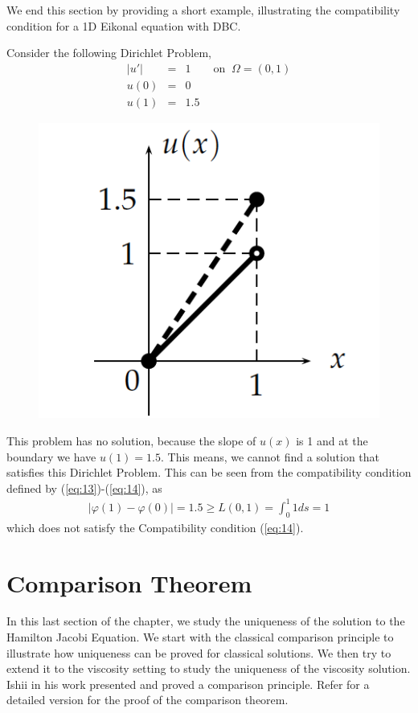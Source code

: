 \noindent
We end this section by providing a short example, illustrating the
compatibility condition for a 1D Eikonal equation with DBC.
\begin{example}
  Consider the following Dirichlet Problem,
  \begin{eqnarray}
    \lvert u' \rvert &=& 1 \qquad \text{on} \;\; \Omega = (0,1)\\
    u(0) &=& 0 \\
    u(1) &=& 1.5
  \end{eqnarray}
  \begin{figure}[h!]
    \centering
    \includegraphics[scale = 0.4]{Images/sol.png}
    \label{fig:3}
  \end{figure}
  \noindent
  This problem has no solution, because the slope of $u(x)$ is 1 and
  at the boundary we have $u(1) = 1.5$. This means, we cannot find a
  solution that satisfies this Dirichlet Problem. This can be seen
  from the compatibility condition defined by
  (\ref{eq:13})-(\ref{eq:14}), as
  \begin{eqnarray}
    \lvert \varphi(1) - \varphi(0) \rvert = 1.5 \ge L(0,1) =
    \int_{0}^{1} 1 ds = 1
  \end{eqnarray}
  which does not satisfy the Compatibility condition (\ref{eq:14}).
\end{example}

\section{Comparison Theorem}
In this last section of the chapter, we study the uniqueness of the
solution to the Hamilton Jacobi Equation. We start with the classical
comparison principle to illustrate how uniqueness can be proved for
classical solutions. We then try to extend it to the viscosity setting
to study the uniqueness of the viscosity solution. Ishii\cite{ishii} in his work
presented and proved a comparison principle. Refer\cite{yong} for a detailed
version for the proof of the comparison theorem.

